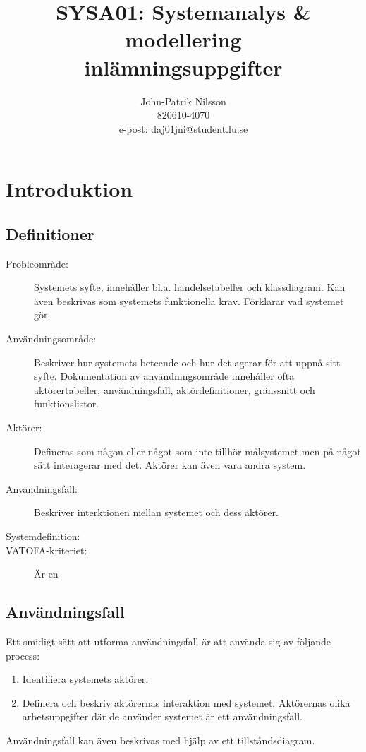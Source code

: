 \documentclass[a4paper,12pt]{article}
\title{\textsf{\textbf{SYSA01: Systemanalys \& modellering \\
    inlämningsuppgifter}}}
\author{John-Patrik Nilsson \\
    820610-4070 \\
	e-post: daj01jni@student.lu.se}
\begin{document}
\maketitle
\thispagestyle{empty}

\newpage
\tableofcontents

\newpage
\section{\textsf{Introduktion}}
\subsection{\textsf{Definitioner}}
\begin{description}
\item[Probleområde:] Systemets syfte, innehåller bl.a. händelsetabeller och klassdiagram. Kan även beskrivas som systemets funktionella krav. Förklarar vad systemet gör.
\item[Användningsområde:] Beskriver hur systemets beteende och hur det agerar för att uppnå sitt syfte. Dokumentation av användningsområde innehåller ofta aktörertabeller, användningsfall, aktördefinitioner, gränssnitt och funktionslistor.
\item[Aktörer:] Defineras som någon eller något som inte tillhör målsystemet men på något sätt interagerar med det. Aktörer kan även vara andra system.
\item[Användningsfall:] Beskriver interktionen mellan systemet och dess aktörer.
\item[Systemdefinition:] 
\item[VATOFA-kriteriet:] Är en 
\end{description}

\subsection{\textsf{Användningsfall}}
Ett smidigt sätt att utforma användningsfall är att använda sig av följande process:

\begin{enumerate}
\item Identifiera systemets aktörer.
\item Definera och beskriv aktörernas interaktion med systemet. Aktörernas olika arbetsuppgifter där de använder systemet är ett användningsfall.
\end{enumerate}

Användningsfall kan även beskrivas med hjälp av ett tillståndsdiagram.
\end{document}
